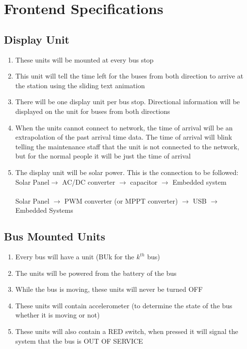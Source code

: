 \section{Frontend Specifications}
\subsection{Display Unit}
\begin{enumerate}
    \item These units will be mounted at every bus stop
    \item This unit will tell the time left for the buses from both direction to arrive at the station using the sliding text animation
    \item There will be one display unit per bus stop. Directional information will be displayed on the unit for buses from both directions
    \item When the units cannot connect to network, the time of arrival will be an extrapolation of the past arrival time data. The time of arrival will blink telling the maintenance staff that the unit is not connected to the network, but for the normal people it will be just the time of arrival
    \item The display unit will be solar power. This is the connection to be followed: \\Solar Panel$\to$ AC/DC converter $\to$ capacitor $\to$ Embedded system \\ \\
Solar Panel $\to$ PWM converter (or MPPT converter) $\to$ USB $\to$ Embedded Systems
\end{enumerate}
\subsection{Bus Mounted Units}
\begin{enumerate}
    \item Every bus will have a unit (BUk for the $k^{th}$ bus)
    \item The units will be powered from the battery of the bus 
    \item While the bus is moving, these units will never be turned OFF
    \item These units will contain accelerometer (to determine the state of the bus whether it is moving or not)
    \item These units will also contain a RED switch, when pressed it will signal the system that the bus is OUT OF SERVICE
\end{enumerate}
